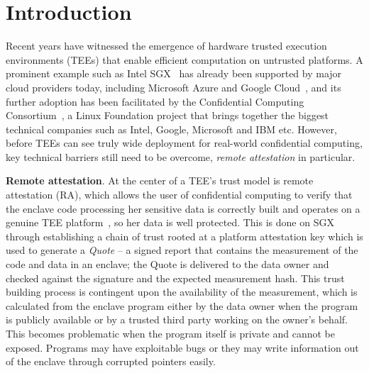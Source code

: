 \section{Introduction}\label{sec-introduction}

Recent years have witnessed the emergence of hardware trusted execution environments (TEEs) that enable efficient computation on untrusted platforms. 
A prominent example such as Intel SGX~\cite{mckeen2013innovative} has already been supported by major cloud providers today, including Microsoft Azure and Google Cloud~\cite{russinovich2017introducing,asylo2019}, and its further adoption has been facilitated by the Confidential Computing Consortium~\cite{ccc2019}, a Linux Foundation project that brings together the biggest technical companies such as Intel, Google, Microsoft and IBM etc. However, before TEEs can see truly wide deployment for real-world confidential computing, key technical barriers still need to be overcome, \textit{remote attestation} in particular.

\vspace{3pt}\noindent\textbf{Remote attestation}. At the center of a TEE's trust model is remote attestation (RA), which allows the user of confidential computing to verify that the enclave code processing her sensitive data is correctly built and operates on a genuine TEE platform~\cite{zhang2017presence}, so her data is well protected. This is done on SGX through establishing a chain of trust rooted at a platform attestation key 
which is used to generate a \textit{Quote} -- a signed report that contains the measurement of the code and data in an enclave; the Quote is delivered to the data owner and checked against the signature and the expected measurement hash. This trust building process is contingent upon the availability of the measurement, which is calculated from the enclave program either by the data owner when the program is publicly available or by a trusted third party working on the owner's behalf. This becomes problematic when the program itself is private and cannot be exposed.
Programs may have exploitable bugs or they may write information out of the enclave through corrupted pointers easily.

